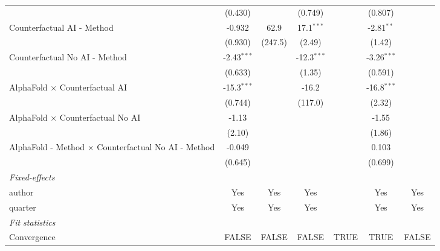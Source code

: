 \begin{tabular}{lcccccc}
                                                              & (0.430)       &         & (0.749)       &      & (0.807)       &   \\   
   Counterfactual AI - Method                                 & -0.932        & 62.9    & 17.1$^{***}$  &      & -2.81$^{**}$  &   \\   
                                                              & (0.930)       & (247.5) & (2.49)        &      & (1.42)        &   \\   
   Counterfactual No AI - Method                              & -2.43$^{***}$ &         & -12.3$^{***}$ &      & -3.26$^{***}$ &   \\   
                                                              & (0.633)       &         & (1.35)        &      & (0.591)       &   \\   
   AlphaFold $\times$ Counterfactual AI                       & -15.3$^{***}$ &         & -16.2         &      & -16.8$^{***}$ &   \\   
                                                              & (0.744)       &         & (117.0)       &      & (2.32)        &   \\   
   AlphaFold $\times$ Counterfactual No AI                    & -1.13         &         &               &      & -1.55         &   \\   
                                                              & (2.10)        &         &               &      & (1.86)        &   \\   
   AlphaFold - Method $\times$ Counterfactual No AI - Method  & -0.049        &         &               &      & 0.103         &   \\   
                                                              & (0.645)       &         &               &      & (0.699)       &   \\   
   \midrule
   \emph{Fixed-effects}\\
   author                                                     & Yes           & Yes     & Yes           &      & Yes           & Yes\\  
   quarter                                                    & Yes           & Yes     & Yes           &      & Yes           & Yes\\  
   \midrule
   \emph{Fit statistics}\\
   Convergence                                                &FALSE          & FALSE   & FALSE         & TRUE & TRUE          & FALSE\\  

\end{tabular}

